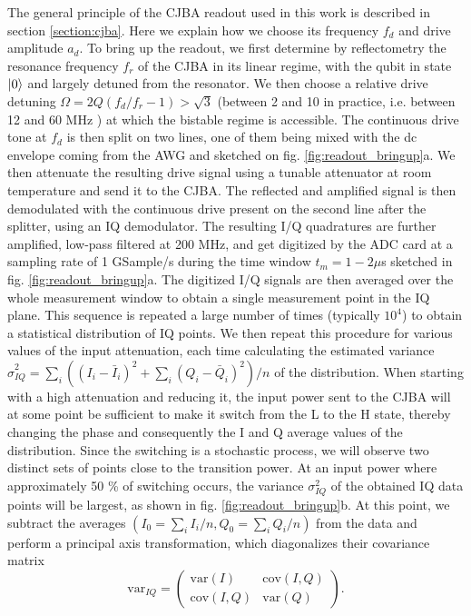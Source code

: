 The general principle of the CJBA readout used in this work is described in section \ref{section:cjba}. Here we explain how we choose its frequency $f_d$ and drive amplitude $a_d$. To bring up the readout, we first determine by reflectometry the resonance frequency $f_r$ of the CJBA in its linear regime, with the qubit in state $\left| 0 \right>$ and largely detuned from the resonator. We then choose a relative drive detuning $\Omega=2Q(f_d/f_r-1)>\sqrt{3}$  (between 2 and 10 in practice, i.e. between 12 and 60 MHz ) at which the bistable regime is accessible. The continuous drive tone at $f_d$ is then split on two lines, one of them being mixed with the dc envelope coming from the AWG and sketched on fig. \ref{fig:readout_bringup}a. We then attenuate the resulting drive signal using a tunable attenuator at room temperature and send it to the CJBA. The reflected and amplified signal is then demodulated with the continuous drive present on the second line after the splitter, using an IQ demodulator. The resulting I/Q quadratures are further amplified, low-pass filtered at 200 MHz, and get digitized by the ADC card at a sampling rate of 1 GSample/s during the time window $t_m=1-2\mu$s sketched in fig. \ref{fig:readout_bringup}a. The digitized I/Q signals are then averaged over the whole measurement window to obtain a single measurement point in the IQ plane.  This sequence is repeated a large number of times (typically $10^4$) to obtain a statistical distribution of IQ points. We then repeat this procedure for various values of the input attenuation, each time calculating the estimated variance $\hat{\sigma}_{IQ}^2=\sum\limits_i ((I_i-\bar{I}_i)^2+\sum\limits_i (Q_i-\bar{Q}_i)^2)/n$ of the distribution. When starting with a high attenuation and reducing it, the input power sent to the CJBA will at some point be sufficient to make it switch from the L to the H state, thereby changing the phase and consequently the I and Q average values of the distribution. Since the switching is a stochastic process, we will observe two distinct sets of points close to the transition power. At an input power where approximately 50 \% of switching occurs, the variance $\sigma_{IQ}^2$ of the obtained IQ data points will be largest, as shown in fig. \ref{fig:readout_bringup}b. At this point, we subtract the averages $(I_0=\sum\limits_i I_i / n,Q_0 = \sum\limits_i Q_i/n)$ from the data and perform a principal axis transformation, which diagonalizes their covariance matrix
%
\begin{equation}
\mathrm{var}_{IQ} = \left(\begin{array}{cc}\mathrm{var}(I) & \mathrm{cov}(I,Q) \\ \mathrm{cov}(I,Q) & \mathrm{var}(Q) \end{array}\right).
\end{equation}
